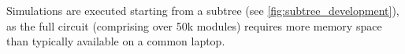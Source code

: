 Simulations are executed starting from a subtree (see
\cref{fig:subtree_development}), as the full circuit (comprising over
50k modules) requires more memory space than typically available on a
common laptop.









